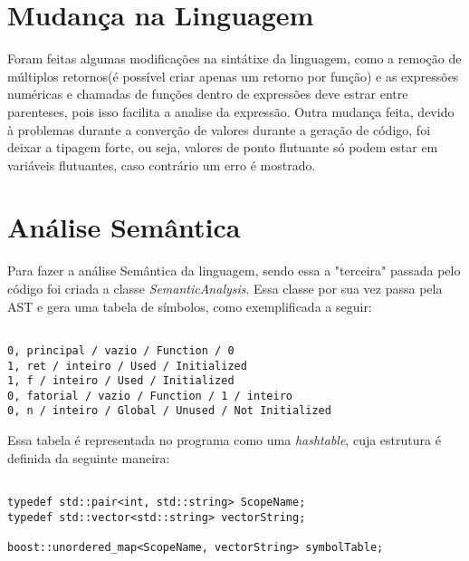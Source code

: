 \documentclass[12pt,a4paper,final]{article}
\begin{document}
\section*{Mudança na Linguagem}

Foram feitas algumas modificações na sintátixe da linguagem, como a remoção de múltiplos retornos(é possível criar apenas um retorno por função) e as expressões numéricas e chamadas de funções dentro de expressões deve estrar entre parenteses, pois isso facilita a analise da expressão.
Outra mudança feita, devido à problemas durante a converção de valores durante a geração de código, foi deixar a tipagem forte, ou seja, valores de ponto flutuante só podem estar em variáveis flutuantes, caso contrário um erro é mostrado.

\section*{Análise Semântica}

Para fazer a análise Semântica da linguagem, sendo essa a "terceira" passada pelo código foi criada a classe \textit{SemanticAnalysis}. Essa classe por sua vez passa pela AST e gera uma tabela de símbolos, como exemplificada a seguir:

\begin{lstlisting}

0, principal / vazio / Function / 0
1, ret / inteiro / Used / Initialized
1, f / inteiro / Used / Initialized
0, fatorial / vazio / Function / 1 / inteiro
0, n / inteiro / Global / Unused / Not Initialized

\end{lstlisting}

Essa tabela é representada no programa como uma \textit{hashtable}, cuja estrutura é definida da seguinte maneira:

\begin{lstlisting}

typedef std::pair<int, std::string> ScopeName;
typedef std::vector<std::string> vectorString;

boost::unordered_map<ScopeName, vectorString> symbolTable;

\end{lstlisting}
\end{document}
